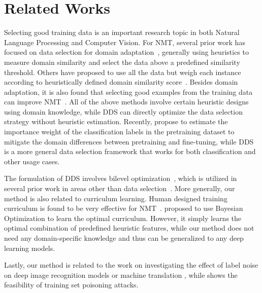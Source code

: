 \section{\label{sec:related_work}Related Works}

Selecting good training data is an important research topic in both Natural Language Processing and Computer Vision. For NMT, several prior work has focused on data selection for domain adaptation~\citep{moore2010intelligent,axelrod2011domain}, generally using heuristics to measure domain similarity and select the data above a predefined similarity threshold. Others have proposed to use all the data but weigh each instance according to heuristically defined domain similarity score~\citep{jiang-zhai-2007-instance,foster-etal-2010-discriminative,wang-etal-2017-instance}. Besides domain adaptation, it is also found that selecting good examples from the training data can improve NMT~\citep{vyas-etal-2018-identifying,pham-etal-2018-fixing}. All of the above methods involve certain heuristic designs using domain knowledge, while DDS can directly optimize the data selection strategy without heuristic estimation. Recently, \cite{domain_adapt_transfer} propose to estimate the importance weight of the classification labels in the pretraining dataset to mitigate the domain differences between pretraining and fine-tuning, while DDS is a more general data selection framework that works for both classification and other usage cases.  

The formulation of DDS involves bilevel optimization~\citep{bilevel_optim,hier_optim}, which is utilized in several prior work in areas other than data selection~\citep{darts,hyper_grad,finn2017model}. More generally, our method is also related to curriculum learning. Human designed training curriculum is found to be very effective for NMT~\citep{zhang2016boosting,zhang2018empirical,platanios19naacl}. \cite{baysian_curriculum} proposed to use Bayesian Optimization to learn the optimal curriculum. However, it simply learns the optimal combination of predefined heuristic features, while our method does not need any domain-specific knowledge and thus can be generalized to any deep learning models.    

Lastly, our method is related to the work on investigating the effect of label noise on deep image recognition models \cite{rolnick2017deep,overfit_random_examples} or machine translation \cite{khayrallah-koehn-2018-impact}, while \citet{koh2017understanding} shows the feasibility of training set poisoning attacks.


